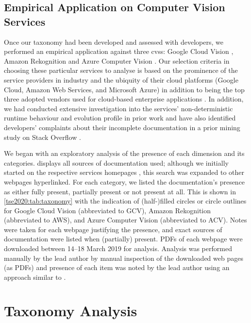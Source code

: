 \subsection{Empirical Application on Computer Vision Services}
\label{tse2020:sec:validation:empirical-app}

Once our taxonomy had been developed and assessed with developers, we performed an empirical application against three \glspl{cvs}:  Google Cloud Vision , Amazon Rekognition  and Azure Computer Vision . Our selection criteria in choosing these particular services to analyse is based on the prominence of the service providers in industry and the ubiquity of their cloud platforms (Google Cloud, Amazon Web Services, and Microsoft Azure) in addition to being the top three adopted vendors used for cloud-based enterprise applications \citep{RightScaleInc:2018kJ}. In addition, we had conducted extensive investigation into the services' non-deterministic runtime behaviour and evolution profile in prior work \citep{Cummaudo:2019icsme} and have also identified developers' complaints about their incomplete documentation in a prior mining study on Stack Overflow \citep{Cummaudo:2020icse}.

We began with an exploratory analysis of the presence of each dimension and its categories.  displays all sources of documentation used; although we initially started on the respective services homepages , this search was expanded to other webpages hyperlinked. For each category, we listed the documentation's presence as either fully present, partially present or not present at all. This is shown in \cref{tse2020:tab:taxonomy} with the indication of \mbox{(half-)filled} circles or circle outlines for Google Cloud Vision (abbreviated to GCV), Amazon Rekognition (abbreviated to AWS), and Azure Computer Vision (abbreviated to ACV). Notes were taken for each webpage justifying the presence, and exact sources of documentation were listed when (partially) present. PDFs of each webpage were downloaded between 14--18 March 2019 for analysis. Analysis was performed manually by the lead author by manual inspection of the downloaded web pages (as PDFs) and presence of each item was noted by the lead author using an approach similar to \citet{Watson:2012uy}.

\section{Taxonomy Analysis}
\label{tse2020:sec:tax-analysis}

